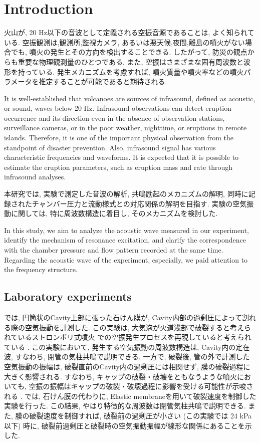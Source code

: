\documentclass[12pt]{article}
\begin{document}
\newpage
\cleardoublepage


\section{Introduction}\label{ACOintro}
火山が, 20 Hz以下の音波として定義される空振音源であることは, よく知られている.
空振観測は,観測所,監視カメラ, あるいは悪天候,夜間,離島の噴火がない場合でも, 噴火の発生とその方向を検出することできる. 
したがって, 防災の観点からも重要な物理観測量のひとつである.
また, 空振はさまざまな固有周波数と波形を持っている. 
発生メカニズムを考慮すれば, 噴火質量や噴火率などの噴火パラメータを推定することが可能であると期待される.

It is well-established that volcanoes are sources of infrasound, defined as acoustic, or sound, waves below 20 Hz.
Infrasound observations can detect eruption occurrence and its direction even in the absence of observation stations, surveillance cameras, or in the poor weather, nighttime, or eruptions in remote islands.
Therefore, it is one of the important physical observation from the standpoint of disaster prevention.
Also, infrasound signal has various characteristic frequencies and waveforms.
It is expected that it is possible to estimate the eruption parameters, such as eruption mass and rate through infrasound analyses.

本研究では, 実験で測定した音波の解析, 共鳴励起のメカニズムの解明, 同時に記録されたチャンバー圧力と流動様式との対応関係の解明を目指す.
実験の空気振動に関しては, 特に周波数構造に着目し, そのメカニズムを検討した. 

In this study, we aim to analyze the acoustic wave measured in our experiment, identify the mechanism of resonance excitation, and clarify the correspondence with the chamber pressure and flow pattern recorded at the same time. 
Regarding the acoustic wave of the experiment, especially, we paid attention to the frequency structure.


\subsection{Laboratory experiments}\label{AcoinEx}
\cite{Vidal2006a}では, 円筒状のCavity上部に張った石けん膜が, Cavity内部の過剰圧によって割れる際の空気振動を計測した. 
この実験は, 大気泡が火道浅部で破裂すると考えられているストロンボリ式噴火 \citep{Chouet1974, BLACKBURN1976, Vergniolle1996c} での空振発生プロセスを再現していると考えられている \citep{Vidal2010a, Gerst2013a}.
この実験において, 発生する空気振動の周波数構造は, Cavity内の定在波, すなわち, 閉管の気柱共鳴で説明できる. 
一方で, 破裂後, 管の外で計測した空気振動の振幅は, 破裂直前のCavity内の過剰圧には相関せず, 膜の破裂過程に大きく影響される. 
すなわち, キャップの破裂・破壊をともなうような噴火においても, 空振の振幅はキャップの破裂・破壊過程に影響を受ける可能性が示唆される \citep{Vidal2010a}. 
\cite{Sanchez2014}では, 石けん膜の代わりに, Elastic membraneを用いて破裂速度を制御した実験を行った. 
この結果, やはり特徴的な周波数は閉管気柱共鳴で説明できる. 
また, 膜の破裂速度を制御すれば, 破裂前の過剰圧が小さい (この実験では 24 kPa以下) 時に, 破裂前過剰圧と破裂時の空気振動振幅が線形な関係にあることを示した. 
\end{document}
